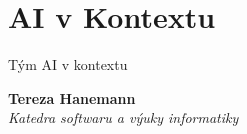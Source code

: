 \documentclass[handout,aspectratio=169,dvipsnames]{beamer}
\begin{document}
\maketitle

\section{AI v Kontextu}

\begin{frame}{Tým AI v kontextu}

    \begin{minipage}{70pt}
    \end{minipage}\begin{minipage}{200pt}
        \textbf{Tereza Hanemann} \\
        \textit{Katedra softwaru a výuky informatiky}
    \end{minipage}

    \vspace{10pt}


\end{frame}
\end{document}
